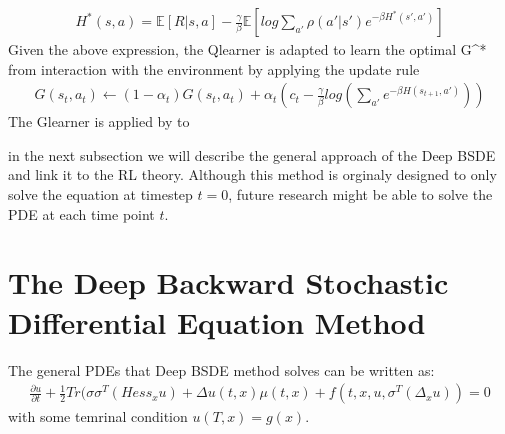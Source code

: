 \documentclass[letterpaper,10pt,english]{jupyterBook}
\begin{document}
\begin{equation*}
\begin{split} H^*(s,a) = \mathbb{E}[R|s,a] -\frac{\gamma}{\beta} \mathbb{E}[log \sum_{a'} \rho(a'|s')e^{-\beta H^*(s',a')}] \end{split}
\end{equation*}
\sphinxAtStartPar
Given the above expression, the Q\sphinxhyphen{}learner is adapted to learn the optimal G\textasciicircum{}* from interaction with the environment by applying the update rule
\begin{equation*}
\begin{split} G(s_t, a_t) \leftarrow (1-\alpha_t)G(s_t,a_t) + \alpha_t(c_t - \frac{\gamma}{\beta}log(\sum_{a'}e^{-\beta H(s_{t+1}, a')})) \end{split}
\end{equation*}
\sphinxAtStartPar
The G\sphinxhyphen{}learner is applied by to

\sphinxAtStartPar
in the next subsection we will describe the general approach of the Deep BSDE and link it to the RL theory. Although this method is orginaly designed to only solve the equation at timestep \(t=0\), future research might be able to solve the PDE at each time point \(t\).


\section{The Deep Backward Stochastic Differential Equation Method}
\label{\detokenize{Reinforcement_learning:the-deep-backward-stochastic-differential-equation-method}}
\sphinxAtStartPar
The general PDEs that Deep BSDE method solves can be written as:
\begin{equation}\label{equation:Reinforcement_learning:gen_form}
\begin{split}\frac{\partial u}{\partial t} + \frac{1}{2} Tr(\sigma \sigma^T (Hess_xu) + \Delta u(t,x)  \mu(t,x) + f(t,x,u, \sigma^T(\Delta_x u)) = 0 \end{split}
\end{equation}
\sphinxAtStartPar
with some temrinal condition \(u(T,x) = g(x)\).
\end{document}
